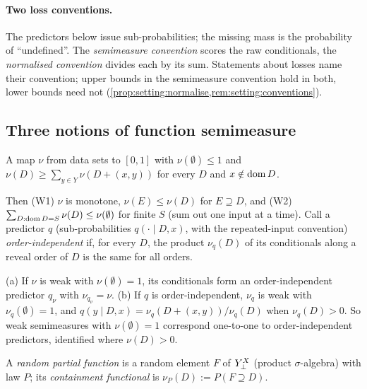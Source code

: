 \paragraph{Two loss conventions.} The predictors below issue sub-probabilities; the missing mass is the probability of ``undefined''. The \emph{semimeasure convention} scores the raw conditionals, the \emph{normalised convention} divides each by its sum. Statements about losses name their convention; upper bounds in the semimeasure convention hold in both, lower bounds need not (\cref{prop:setting:normalise,rem:setting:conventions}).

\subsection{Three notions of function semimeasure}\label{sec:setting:weak}

\begin{definition}\label{def:setting:weak}
A map $\nu$ from data sets to $[0,1]$ with $\nu(\emptyset)\le1$ and $\nu(D)\ge\sum_{y\in Y}\nu(D+(x,y))$ for every $D$ and $x\notin\operatorname{dom} D$.
\end{definition}

Then (W1) $\nu$ is monotone, $\nu(E)\le\nu(D)$ for $E\supseteq D$, and (W2) $\sum_{D:\operatorname{dom} D=S}\nu(D)\le\nu(\emptyset)$ for finite $S$ (sum out one input at a time). Call a predictor $q$ (sub-probabilities $q(\cdot\mid D,x)$, with the repeated-input convention) \emph{order-independent} if, for every $D$, the product $\nu_q(D)$ of its conditionals along a reveal order of $D$ is the same for all orders.

\begin{proposition}\label{prop:setting:predictor}
(a) If $\nu$ is weak with $\nu(\emptyset)=1$, its conditionals form an order-independent predictor $q_\nu$ with $\nu_{q_\nu}=\nu$. (b) If $q$ is order-independent, $\nu_q$ is weak with $\nu_q(\emptyset)=1$, and $q(y\mid D,x)=\nu_q(D+(x,y))/\nu_q(D)$ when $\nu_q(D)>0$. So weak semimeasures with $\nu(\emptyset)=1$ correspond one-to-one to order-independent predictors, identified where $\nu(D)>0$.
\end{proposition}

\begin{definition}\label{def:setting:rpf}
A \emph{random partial function} is a random element $F$ of $Y_{\bot}^X$ (product $\sigma$-algebra) with law $P$; its \emph{containment functional} is $\nu_P(D):=P(F\supseteq D)$.
\end{definition}

